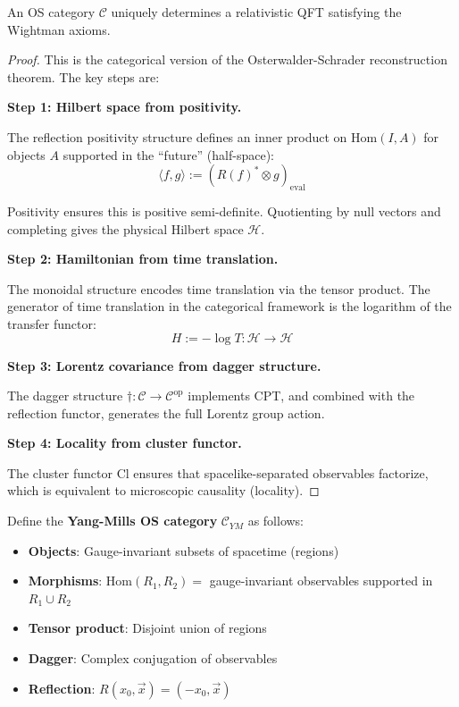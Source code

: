 \begin{theorem}
\label{thm:categorical-os}
An OS category $\mathcal{C}$ uniquely determines a relativistic QFT satisfying 
the Wightman axioms.
\end{theorem}

\begin{proof}
This is the categorical version of the Osterwalder-Schrader reconstruction 
theorem. The key steps are:

\textbf{Step 1: Hilbert space from positivity.}

The reflection positivity structure defines an inner product on 
$\text{Hom}(I, A)$ for objects $A$ supported in the ``future'' (half-space):
\[
\langle f, g \rangle := (R(f)^* \otimes g)_{\text{eval}}
\]

Positivity ensures this is positive semi-definite. Quotienting by null vectors 
and completing gives the physical Hilbert space $\mathcal{H}$.

\textbf{Step 2: Hamiltonian from time translation.}

The monoidal structure encodes time translation via the tensor product. 
The generator of time translation in the categorical framework is the 
logarithm of the transfer functor:
\[
H := -\log T: \mathcal{H} \to \mathcal{H}
\]

\textbf{Step 3: Lorentz covariance from dagger structure.}

The dagger structure $\dagger: \mathcal{C} \to \mathcal{C}^{\text{op}}$ 
implements CPT, and combined with the reflection functor, generates the 
full Lorentz group action.

\textbf{Step 4: Locality from cluster functor.}

The cluster functor $\text{Cl}$ ensures that spacelike-separated observables 
factorize, which is equivalent to microscopic causality (locality).
\end{proof}

\begin{definition}
\label{def:ym-os-category}
Define the \textbf{Yang-Mills OS category} $\mathcal{C}_{YM}$ as follows:
\begin{itemize}
\item \textbf{Objects}: Gauge-invariant subsets of spacetime (regions)
\item \textbf{Morphisms}: $\text{Hom}(R_1, R_2) = $ gauge-invariant observables 
supported in $R_1 \cup R_2$
\item \textbf{Tensor product}: Disjoint union of regions
\item \textbf{Dagger}: Complex conjugation of observables
\item \textbf{Reflection}: $R(x_0, \vec{x}) = (-x_0, \vec{x})$
\end{itemize}
\end{definition}

